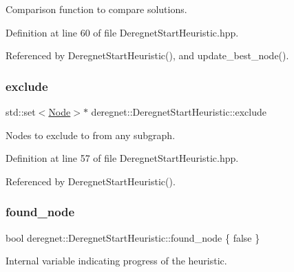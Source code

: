 Comparison function to compare solutions. 



Definition at line 60 of file Deregnet\+Start\+Heuristic.\+hpp.



Referenced by Deregnet\+Start\+Heuristic(), and update\+\_\+best\+\_\+node().

\mbox{\label{classderegnet_1_1DeregnetStartHeuristic_aa22c6581cd404bf7ac325850b28dc951}} 
\subsubsection{\texorpdfstring{exclude}{exclude}}
{\footnotesize\ttfamily std\+::set$<$\hyperlink{namespacederegnet_a744bad34f2de9856d36715a445f027f3}{Node}$>$$\ast$ deregnet\+::\+Deregnet\+Start\+Heuristic\+::exclude\hspace{0.3cm}{\ttfamily [protected]}}



Nodes to exclude to from any subgraph. 



Definition at line 57 of file Deregnet\+Start\+Heuristic.\+hpp.



Referenced by Deregnet\+Start\+Heuristic().

\mbox{\label{classderegnet_1_1DeregnetStartHeuristic_a1ca705794583fb3b6e563efeceb4445e}} 
\subsubsection{\texorpdfstring{found\+\_\+node}{found\_node}}
{\footnotesize\ttfamily bool deregnet\+::\+Deregnet\+Start\+Heuristic\+::found\+\_\+node \{ false \}\hspace{0.3cm}{\ttfamily [protected]}}



Internal variable indicating progress of the heuristic. 



